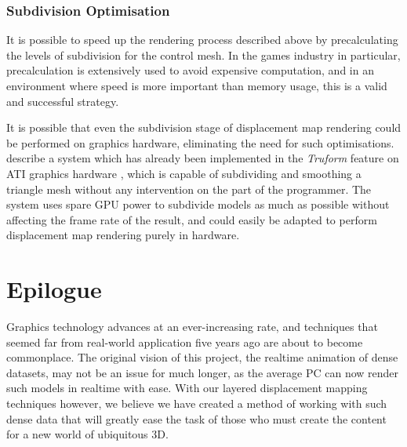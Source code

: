 \subsubsection{\label{sec:conclusion:future:realtime:subdivision}Subdivision Optimisation}

It is possible to speed up the rendering process described above by precalculating the levels of subdivision for the control mesh. In the games industry in particular, precalculation is extensively used to avoid expensive computation, and in an environment where speed is more important than memory usage, this is a valid and successful strategy.

It is possible that even the subdivision stage of displacement map rendering could be performed on graphics hardware, eliminating the need for such optimisations. \citet{Vlachos01} describe a system which has already been implemented in the {\it Truform} feature on ATI  graphics hardware \cite{ATI01}, which is capable of subdividing and smoothing a triangle mesh without any intervention on the part of the programmer. The system uses spare GPU power to subdivide models as much as possible without affecting the frame rate of the result, and could easily be adapted to perform displacement map rendering purely in hardware.

\section{\label{sec:conclusion:fin}Epilogue}

Graphics technology advances at an ever-increasing rate, and techniques that seemed far from real-world application five years ago are about to become commonplace. The original vision of this project, the realtime animation of dense datasets, may not be an issue for much longer, as the average PC can now render such models in realtime with ease. With our layered displacement mapping techniques however, we believe we have created a method of working with such dense data that will greatly ease the task of those who must create the content for a new world of ubiquitous 3D.
